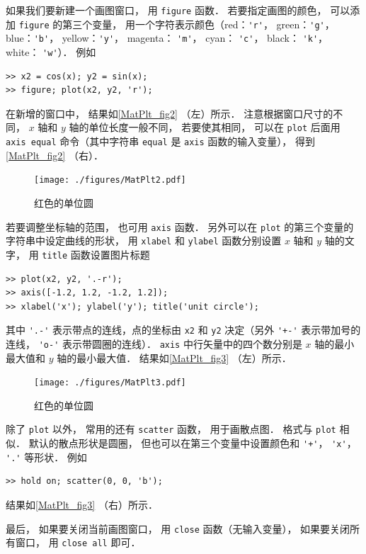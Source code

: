 如果我们要新建一个画图窗口， 用 \lstinline|figure| 函数． 若要指定画图的颜色， 可以添加 \lstinline|figure| 的第三个变量， 用一个字符表示颜色（red：\lstinline|'r'|， green：\lstinline|'g'|， blue：\lstinline|'b'|， yellow：\lstinline|'y'|， magenta： \lstinline|'m'|， cyan： \lstinline|'c'|， black： \lstinline|'k'|， white： \lstinline|'w'|）． 例如
\begin{lstlisting}[language=MatlabCom]
>> x2 = cos(x); y2 = sin(x);
>> figure; plot(x2, y2, 'r');
\end{lstlisting}
在新增的窗口中， 结果如\autoref{MatPlt_fig2} （左）所示． 注意根据窗口尺寸的不同， $x$ 轴和 $y$ 轴的单位长度一般不同， 若要使其相同， 可以在 \lstinline|plot| 后面用 \lstinline|axis equal| 命令（其中字符串 \lstinline|equal| 是 \lstinline|axis| 函数的输入变量）， 得到\autoref{MatPlt_fig2} （右）．
\begin{figure}[ht]
\centering
\texttt{[image: ./figures/MatPlt2.pdf]}
\caption{红色的单位圆} \label{MatPlt_fig2}
\end{figure}
若要调整坐标轴的范围， 也可用 \lstinline|axis| 函数． 另外可以在 \lstinline|plot| 的第三个变量的字符串中设定曲线的形状， 用 \lstinline|xlabel| 和 \lstinline|ylabel| 函数分别设置 $x$ 轴和 $y$ 轴的文字， 用 \lstinline|title| 函数设置图片标题
\begin{lstlisting}[language=MatlabCom]
>> plot(x2, y2, '.-r');
>> axis([-1.2, 1.2, -1.2, 1.2]);
>> xlabel('x'); ylabel('y'); title('unit circle');
\end{lstlisting}
其中 \lstinline|'.-'| 表示带点的连线，点的坐标由 \lstinline|x2| 和 \lstinline|y2| 决定（另外 \lstinline|'+-'| 表示带加号的连线， \lstinline|'o-'| 表示带圆圈的连线）． \lstinline|axis| 中行矢量中的四个数分别是 $x$ 轴的最小最大值和 $y$ 轴的最小最大值． 结果如\autoref{MatPlt_fig3} （左）所示．
\begin{figure}[ht]
\centering
\texttt{[image: ./figures/MatPlt3.pdf]}
\caption{红色的单位圆} \label{MatPlt_fig3}
\end{figure}

除了 \lstinline|plot| 以外， 常用的还有 \lstinline|scatter| 函数， 用于画散点图． 格式与 \lstinline|plot| 相似． 默认的散点形状是圆圈， 但也可以在第三个变量中设置颜色和 \lstinline|'+'|， \lstinline|'x'|， \lstinline|'.'| 等形状． 例如
\begin{lstlisting}[language=MatlabCom]
>> hold on; scatter(0, 0, 'b');
\end{lstlisting}
结果如\autoref{MatPlt_fig3} （右）所示．

最后， 如果要关闭当前画图窗口， 用 \lstinline|close| 函数（无输入变量）， 如果要关闭所有窗口， 用 \lstinline|close all| 即可．
